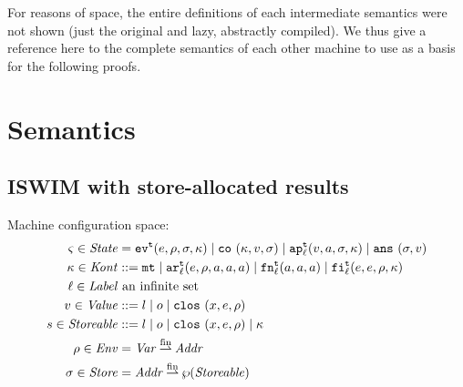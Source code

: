 \documentclass{llncs}
\newcommand{\finto}{\mathbin{\overset{\text{fin}}{\rightharpoonup}}}
\newcommand{\alt}{\mid}
\begin{document}
For reasons of space, the entire definitions of each intermediate
semantics were not shown (just the original and lazy, abstractly
compiled). We thus give a reference here to the complete semantics of
each other machine to use as a basis for the following proofs.

\section{Semantics}

\subsection{ISWIM with store-allocated results}

Machine configuration space:
\begin{align*}
\mstate \in \State &= \ev[^\mcntr]{\mexp, \menv, \msto, \mkont} \alt
                     \co{\mkont, \mval, \msto} \alt
                     \ap[_\mlab^\mcntr]{\mval,\maddr,\msto,\mkont} \alt
                     \ans{\msto,\mval} \\
\mkont \in \Kont &::= \kmt \alt
                      \kar[_\mlab^\mcntr]{\mexp, \menv, \maddr,\maddr,\maddr} \alt
                      \kfn[_\mlab^\mcntr]{\maddr, \maddr, \maddr} \alt
                      \kif[_\mlab^\mcntr]{\mexp, \mexp, \menv, \mkont} \\
\mlab \in \Label &\text{ an infinite set} \\
\mval \in \Value &::= \mlit \alt \mop \alt
                      \clos{\mvar,\mexp,\menv} \\
\mstor \in \Storeable &::= \mlit \alt \mop \alt
                           \clos{\mvar,\mexp,\menv} \alt
                           \mkont \\
\menv \in \Env &= \Var \finto \Addr \\
\msto \in \Store &= \Addr \finto \wp(\Storeable)
\end{align*}
\end{document}
